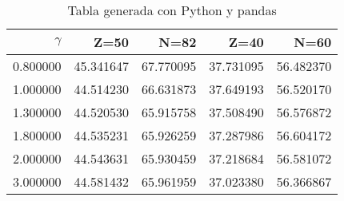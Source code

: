 \begin{table}
\caption{Tabla generada con Python y pandas}
\label{tab:datos}
\begin{tabular}{rrrrr}
\toprule
$\gamma$ & Z=50 & N=82 & Z=40 & N=60 \\
\midrule
0.800000 & 45.341647 & 67.770095 & 37.731095 & 56.482370 \\
1.000000 & 44.514230 & 66.631873 & 37.649193 & 56.520170 \\
1.300000 & 44.520530 & 65.915758 & 37.508490 & 56.576872 \\
1.800000 & 44.535231 & 65.926259 & 37.287986 & 56.604172 \\
2.000000 & 44.543631 & 65.930459 & 37.218684 & 56.581072 \\
3.000000 & 44.581432 & 65.961959 & 37.023380 & 56.366867 \\
\bottomrule
\end{tabular}
\end{table}
